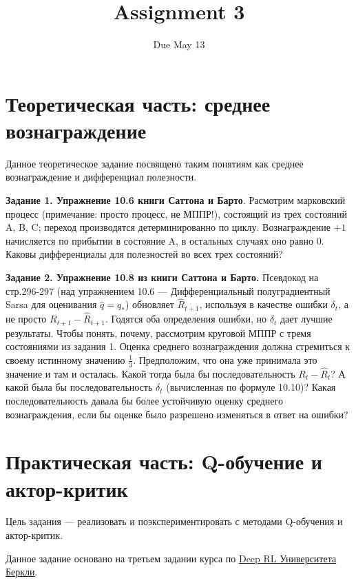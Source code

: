 \documentclass[12pt, oneside]{article}
\author{Due May 13}
\title{Assignment 3}
\date{}
\begin{document}
\maketitle
\thispagestyle{fancy}

\section{Теоретическая часть: среднее вознаграждение}

Данное теоретическое задание посвящено таким понятиям как среднее вознаграждение и дифференциал полезности.

\textbf{Задание 1. Упражнение 10.6 книги Саттона и Барто}. Расмотрим марковский процесс (примечание: просто процесс, не МППР!), состоящий из трех состояний A, B, C; переход производятся детерминированно по циклу. Вознаграждение $+1$ начисляется по прибытии в состояние A, в остальных случаях оно равно 0. Каковы дифференциалы для полезностей во всех трех состояний?

\textbf{Задание 2. Упражнение 10.8 из книги Саттона и Барто.} Псевдокод на стр.296-297 (над упражнением 10.6 --- Дифференциальный полуградиентный Sarsa для оценивания $\hat{q} = q_*$) обновляет $\hat{R}_{t+1}$, используя в качестве ошибки $\delta_t$, а не просто $R_{t+1} - \hat{R}_{t+1}$. Годятся оба определения ошибки, но $\delta_t$ дает лучшие результаты. Чтобы понять, почему, рассмотрим круговой МППР с тремя состояниями из задания 1. Оценка среднего вознаграждения должна стремиться к своему истинному значению $\frac{1}{3}$. Предположим, что она уже принимала это значение и там и осталась. Какой тогда была бы последовательность $R_t - \hat{R}_t$? А какой была бы последовательность $\delta_t$ (вычисленная по формуле 10.10)? Какая последовательность давала бы более устойчивую оценку среднего вознаграждения, если бы оценке было разрешено изменяться в ответ на ошибки?

\section{Практическая часть: Q-обучение и актор-критик}

Цель задания --- реализовать и поэкспериментировать с методами Q-обучения и актор-критик.

Данное задание основано на третьем задании курса по \href{http://rail.eecs.berkeley.edu/deeprlcourse/}{Deep RL Университета Беркли}.
\end{document}
